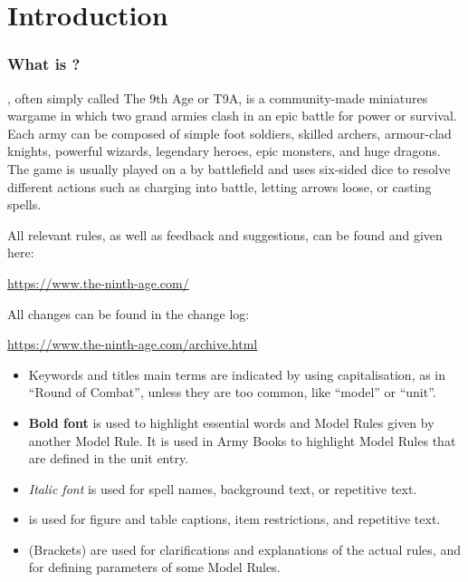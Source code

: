 
\part{Introduction}

\section{What is \nameofthegame{}?}

\nameofthegame{}, often simply called The 9th Age or T9A, is a community-made miniatures wargame in which two grand armies clash in an epic battle for power or survival. Each army can be composed of simple foot soldiers, skilled archers, armour-clad knights, powerful wizards, legendary heroes, epic monsters, and huge dragons. The game is usually played on a  by  battlefield and uses six-sided dice to resolve different actions such as charging into battle, letting arrows loose, or casting spells.

All relevant rules, as well as feedback and suggestions, can be found and given here:
\begin{center}
\href{https://www.the-ninth-age.com/}{https://www.the-ninth-age.com/}
\end{center}

All changes can be found in the change log:

\begin{center}
\href{https://www.the-ninth-age.com/archive.html}{https://www.the-ninth-age.com/archive.html}
\end{center}

\begin{itemize}
\item

Keywords and titles main terms are indicated by using capitalisation, as in \enquote{Round of Combat}, unless they are too common, like \enquote{model} or \enquote{unit}.

\item

\textbf{Bold font} is used to highlight essential words and Model Rules given by another Model Rule. It is used in Army Books to highlight Model Rules that are defined in the unit entry.

\item

\textit{Italic font} is used for spell names, background text, or repetitive text.

\item
{} is used for figure and table captions, item restrictions, and repetitive text.
\item

(Brackets) are used for clarifications and explanations of the actual rules, and for defining parameters of some Model Rules.

\end{itemize}

